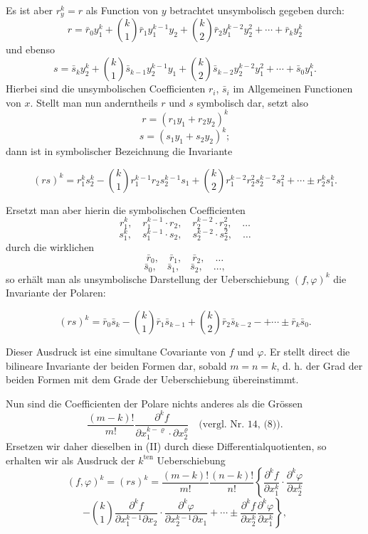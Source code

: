 \documentclass[11pt]{article}
\providecommand{\weberpage}[1]{}
\providecommand{\weq}[2]{\begin{equation}\tag{#1}#2\end{equation}}
\begin{document}
\weberpage{36}

Es ist aber $r_y^k = r$ als Function von $y$ betrachtet unsymbolisch
gegeben durch:
\[
r = \bar r_0 y_1^k + \binom{k}{1} \bar r_1 y_1^{k-1} y_2 + \binom{k}{2} \bar r_2 y_1^{k-2} y_2^2 + \cdots + \bar r_k y_2^k
\]
und ebenso
\[
s = \bar s_k y_2^k + \binom{k}{1} \bar s_{k-1} y_2^{k-1} y_1 + \binom{k}{2} \bar s_{k-2} y_2^{k-2} y_1^2 + \cdots + \bar s_0 y_1^k.
\]
Hierbei sind die unsymbolischen Coefficienten $r_i$, $\bar s_i$ im
Allgemeinen Functionen von $x$. Stellt man nun anderntheils $r$ und $s$
symbolisch dar, setzt also
\[
r = (r_1 y_1 + r_2 y_2)^k
\]
\[
s = (s_1 y_1 + s_2 y_2)^k;
\]
dann ist in symbolischer Bezeichnung die Invariante

\weq{I}{(rs)^k = r_1^k s_2^k - \binom{k}{1} r_1^{k-1} r_2 s_2^{k-1} s_1 + \binom{k}{2} r_1^{k-2} r_2^2 s_2^{k-2} s_1^2 + \cdots \pm r_2^k s_1^k.}

Ersetzt man aber hierin die symbolischen Coefficienten
\[
r_1^k, \quad r_1^{k-1} \cdot r_2, \quad r_2^{k-2} \cdot r_2^2, \quad \ldots %
\]
\[
s_1^k, \quad s_1^{k-1} \cdot s_2, \quad s_2^{k-2} \cdot s_2^2, \quad \ldots
\]
durch die wirklichen
\[
\bar r_0, \quad \bar r_1, \quad \bar r_2, \quad \ldots
\]
\[
\bar s_0, \quad \bar s_1, \quad \bar s_2, \quad \ldots,
\]
so erhält man als unsymbolische Darstellung der Ueberschiebung
$(f, \varphi)^k$ die Invariante der Polaren:

\weq{II}{(rs)^k = \bar r_0 \bar s_k - \binom{k}{1} \bar r_1 \bar s_{k-1} + \binom{k}{2} \bar r_2 \bar s_{k-2} - + \cdots \pm \bar r_k \bar s_0.}

Dieser Ausdruck ist eine simultane Covariante von $f$ und $\varphi$. Er
stellt direct die bilineare Invariante der beiden Formen dar, sobald
$m = n = k$, d. h. der Grad der beiden Formen mit dem Grade der
Ueberschiebung übereinstimmt.

Nun sind die Coefficienten der Polare nichts anderes als die Grössen
\[
\frac{(m-k)!}{m!} \frac{\partial^k f}{\partial x_1^{k-\varrho} \cdot \partial x_2^\varrho} \quad \text{(vergl. Nr. 14, (8)).}
\]
Ersetzen wir daher dieselben in (II) durch diese Differentialquotienten,
so erhalten wir als Ausdruck der $k^{\text{ten}}$ Ueberschiebung
\[
(f, \varphi)^k = (rs)^k = \frac{(m-k)!}{m!} \frac{(n-k)!}{n!} \left\{ \frac{\partial^k f}{\partial x_1^k} \cdot \frac{\partial^k \varphi}{\partial x_2^k} \right.
\]
\[
\left. - \binom{k}{1} \frac{\partial^k f}{\partial x_1^{k-1} \partial x_2} \cdot \frac{\partial^k \varphi}{\partial x_2^{k-1} \partial x_1} + \cdots \pm \frac{\partial^k f}{\partial x_2^k} \frac{\partial^k \varphi}{\partial x_1^k} \right\},
\]
\end{document}
